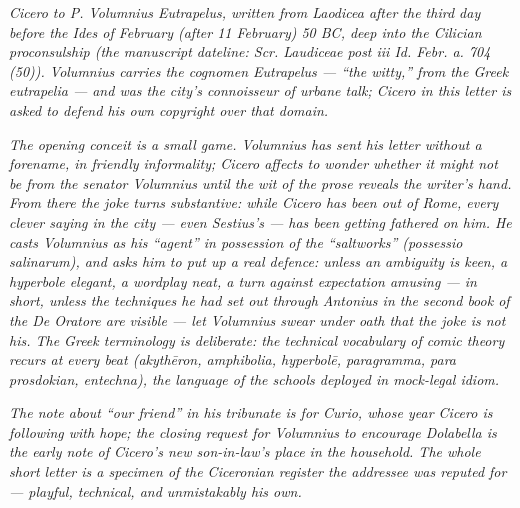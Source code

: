 
\textit{Cicero to P. Volumnius Eutrapelus, written from Laodicea
after the third day before the Ides of February (after 11 February)
50 BC, deep into the Cilician proconsulship (the manuscript dateline:
\textit{Scr. Laudiceae post iii Id. Febr. a. 704 (50)}). Volumnius
carries the cognomen Eutrapelus --- ``the witty,'' from the Greek
\textit{eutrapelia} --- and was the city's connoisseur of urbane
talk; Cicero in this letter is asked to defend his own copyright over
that domain.}

\textit{The opening conceit is a small game. Volumnius has sent his
letter without a forename, in friendly informality; Cicero affects
to wonder whether it might not be from the senator Volumnius until
the wit of the prose reveals the writer's hand. From there the joke
turns substantive: while Cicero has been out of Rome, every clever
saying in the city --- even Sestius's --- has been getting fathered
on him. He casts Volumnius as his ``agent'' in possession of the
``saltworks'' (\textit{possessio salinarum}), and asks him to put up
a real defence: unless an ambiguity is keen, a hyperbole elegant, a
wordplay neat, a turn against expectation amusing --- in short,
unless the techniques he had set out through Antonius in the second
book of the \textit{De Oratore} are visible --- let Volumnius swear
under oath that the joke is not his. The Greek terminology is
deliberate: the technical vocabulary of comic theory recurs at every
beat (\textit{akythēron}, \textit{amphibolia}, \textit{hyperbolē},
\textit{paragramma}, \textit{para prosdokian}, \textit{entechna}),
the language of the schools deployed in mock-legal idiom.}

\textit{The note about ``our friend'' in his tribunate is for Curio,
whose year Cicero is following with hope; the closing request for
Volumnius to encourage Dolabella is the early note of Cicero's new
son-in-law's place in the household. The whole short letter is a
specimen of the Ciceronian register the addressee was reputed for ---
playful, technical, and unmistakably his own.}

